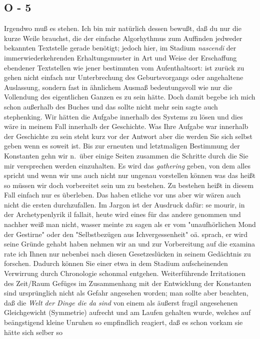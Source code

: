 \documentclass[
]{article}
\author{}
\date{\vspace{-2.5em}}
\begin{document}
\subsection{O - 5}\label{o---5}

Irgendwo muß es stehen. Ich bin mir natürlich dessen bewußt, daß du nur
die kurze Weile brauchst, die der einfache Algorhythmus zum Auffinden
jedweder bekannten Textstelle gerade benötigt; jedoch hier, im Stadium
\emph{nascendi} der immerwiederkehrenden Erhaltungsmuster in Art und
Weise der Erschaffung ebendener Textstellen wie jener bestimmten vom
Aufenthaltsort: ist zurück zu gehen nicht einfach nur Unterbrechung des
Geburtsvorgangs oder angehaltene Auslassung, sondern fast in ähnlichem
Ausmaß bedeutungsvoll wie nur die Vollendung des eigentlichen Ganzen es
zu sein hätte. Doch damit begebe ich mich schon außerhalb des Buches und
das sollte nicht mehr sein sagte auch stephenking. Wir hätten die
Aufgabe innerhalb des Systems zu lösen und dies wäre in meinem Fall
innerhalb der Geschichte. Was Ihre Aufgabe war innerhalb der Geschichte
zu sein steht kurz vor der Antwort aber die werden Sie sich selbst geben
wenn es soweit ist. Bis zur erneuten und letztmaligen Bestimmung der
Konstanten gehn wir n.~über einige Seiten zusammen die Schritte durch
die Sie mir versprechen werden einzuhalten. Es wird das \emph{gathering}
geben, von dem alles spricht und wenn wir uns auch nicht nur ungenau
vorstellen können was das heißt so müssen wir doch vorbereitet sein um
zu bestehen. Zu bestehen heißt in diesem Fall einfach nur es überleben.
Das haben etliche vor uns aber wir wären auch nicht die ersten
durchzufallen. Im Jargon ist der Ausdruck dafür: se mourir, in der
Archetypenlyrik il fallait, heute wird eines für das andere genommen und
nachher weiß man nicht, wasser meinte zu sagen als er vom
"unaufhörlichen Mond der Gestirne" oder den "Selbstbezügen aus
Ichvergessenheit" oä. sprach, er wird seine Gründe gehabt haben nehmen
wir an und zur Vorbereitung auf die examina rate ich Ihnen nur nebenbei
nach diesen Gesetzeslücken in seinem Gedächtnis zu forschen. Dadurch
können Sie einer etwa in dem Stadium aufscheinenden Verwirrung durch
Chronologie schonmal entgehen. Weiterführende Irritationen des Zeit/Raum
Gefüges im Zusammenhang mit der Entwicklung der Konstanten sind
ursprünglich nicht als Gefahr angesehen worden; man sollte aber
beachten, daß die \emph{Welt der Dinge die da sind} von einem als
äußerst fragil angesehenen Gleichgewicht (Symmetrie) aufrecht und am
Laufen gehalten wurde, welches auf beängstigend kleine Unruhen so
empfindlich reagiert, daß es schon vorkam sie hätte sich selber so
\end{document}
